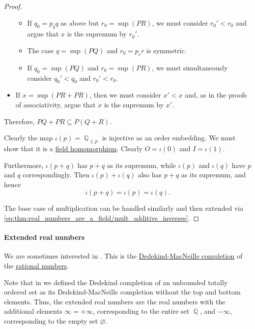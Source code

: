 \begin{proof}
\begin{itemize}
\begin{itemize}
      \item If \( q_0 = p_q q \) as above but \( r_0 = \sup(PR) \), we must consider \( r_0' < r_0 \) and argue that \( x \) is the supremum by \( r_0' \).

      \item The case \( q = \sup(PQ) \) and \( r_0 = p_r r \) is symmetric.

      \item If \( q_0 = \sup(PQ) \) and \( r_0 = \sup(PR) \), we must simultaneously consider \( q_0' < q_0 \) and \( r_0' < r_0 \).
    \end{itemize}

    \item If \( x = \sup(PR + PR) \), then we must consider \( x' < x \) and, as in the proofs of associativity, argue that \( x \) is the supremum by \( x' \).
  \end{itemize}

  Therefore, \( PQ + PR \subseteq P(Q + R) \).

   Clearly the map \( \iota(p) = \BbbQ_{\leq p} \) is injective as an order embedding. We must show that it is a \hyperref[def:field/homomorphism]{field homomorphism}. Clearly \( O = \iota(0) \) and \( I = \iota(1) \).

  Furthermore, \( \iota(p + q) \) has \( p + q \) as its supremum, while \( \iota(p) \) and \( \iota(q) \) have \( p \) and \( q \) correspondingly. Then \( \iota(p) + \iota(q) \) also has \( p + q \) as its supremum, and hence
  \begin{equation*}
    \iota(p + q) = \iota(p) = \iota(q).
  \end{equation*}

  The base case of multiplication can be handled similarly and then extended via \eqref{eq:thm:real_numbers_are_a_field/mult_additive_inverses}.
\end{proof}

\paragraph{Extended real numbers}

\begin{definition}\label{def:extended_real_numbers}\mimprovised
  We are sometimes interested in . This is the \hyperref[def:dedekind_macnielle_completion]{Dedekind-MacNeille completion} of the \hyperref[def:rational_numbers]{rational numbers}.
\end{definition}
\begin{comments}
  \item Note that in  we defined the Dedekind completion of an unbounded totally ordered set as its Dedekind-MacNeille completion without the top and bottom elements. Thus, the extended real numbers are the real numbers with the additional elements \( \infty = +\infty \), corresponding to the entire set \( \BbbQ \), and \( -\infty \), corresponding to the empty set \( \varnothing \).
\end{comments}

